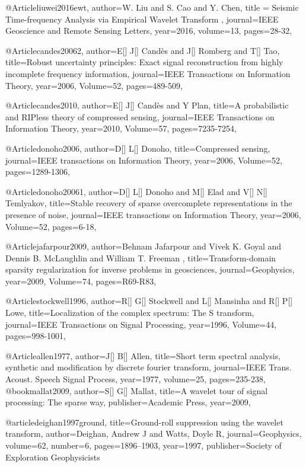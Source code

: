 @Article{liuwei2016ewt,
  author={W. Liu and S. Cao and Y. Chen},
  title = {Seismic Time-frequency Analysis via Empirical Wavelet Transform
},
  journal={IEEE Geoscience and Remote Sensing Letters},
  year=2016,
  volume=13,
  pages={28-32},
}

@Article{candes20062,
  author={E[] J[] Cand\`{e}s and J[] Romberg and T[] Tao},
  title={Robust uncertainty principles: Exact signal reconstruction from highly incomplete frequency information},
  journal={IEEE Transactions on Information Theory},
  year=2006,
  Volume=52,
  pages={489-509},
}

@Article{candes2010,
  author={E[] J[] Cand\`{e}s and Y Plan},
  title={A probabilistic and RIPless theory of compressed sensing},
  journal={IEEE Transactions on Information Theory},
  year=2010,
  Volume=57,
  pages={7235-7254},
}


@Article{donoho2006,
  author={D[] L[] Donoho},
  title={Compressed sensing},
  journal={IEEE transactions on Information Theory},
  year=2006,
  Volume=52,
  pages={1289-1306},
}

@Article{donoho20061,
  author={D[] L[] Donoho and M[] Elad and V[] N[] Temlyakov},
  title={Stable recovery of sparse overcomplete representations in the presence of noise},
  journal={IEEE transactions on Information Theory},
  year=2006,
  Volume=52,
  pages={6-18},
}

@Article{jafarpour2009,
  author={Behnam Jafarpour and Vivek K. Goyal and Dennis B. McLaughlin and William T. Freeman },
  title={Transform-domain sparsity regularization for inverse problems in
geosciences},
  journal={Geophysics},
  year=2009,
  Volume=74,
  pages={R69-R83},
}

@Article{stockwell1996,
  author={R[] G[] Stockwell and L[] Mansinha and R[] P[] Lowe},
  title={Localization of the complex spectrum: The S transform},
  journal={IEEE Transactions on Signal Processing},
  year=1996,
  Volume=44,
  pages={998-1001},
}

@Article{allen1977,
  author={J[] B[] Allen},
  title={Short term spectral analysis, synthetic and modification by discrete fourier transform},
  journal={IEEE Trans. Acoust. Speech Signal Process},
  year=1977,
  volume=25,
  pages={235-238},
}
@book{mallat2009,
  author={S[] G[] Mallat},
  title={A wavelet tour of signal processing: The sparse way},
  publisher={Academic Press},
  year=2009,
}

@article{deighan1997ground,
  title={Ground-roll suppression using the wavelet transform},
  author={Deighan, Andrew J and Watts, Doyle R},
  journal={Geophysics},
  volume={62},
  number={6},
  pages={1896--1903},
  year={1997},
  publisher={Society of Exploration Geophysicists}
}

